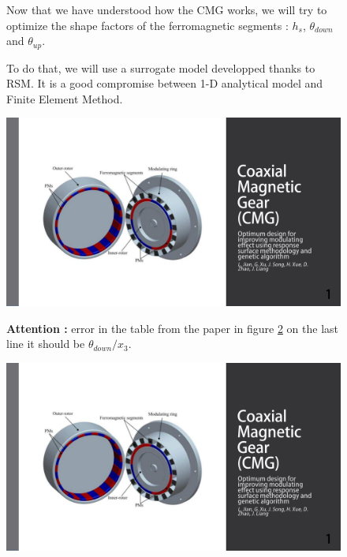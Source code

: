 \begin{figure}[H]
    \begin{minipage}{.45\linewidth}
    Now that we have understood how the CMG works, we will try to optimize the shape factors of the ferromagnetic segments : $h_s$, $\theta_{down}$ and $\theta_{up}$.
    
    To do that, we will use a surrogate model developped thanks to RSM. It is a good compromise between 1-D analytical model and Finite Element Method.
    \end{minipage}
    \hfill%
    \begin{minipage}[c]{.53\linewidth}
        \centering
        \includegraphics[page={56},width=\textwidth]{LELEC2311.allow.pdf}
        \label{fig:56_th slide}
        \caption{}
    \end{minipage}
\end{figure}

\begin{figure}[H]
    \begin{minipage}{.45\linewidth}
    \textbf{Attention :} error in the table from the paper in figure \ref{fig:57_th slide}
    on the last line it should be $\theta_{down}/x_3$.
    \end{minipage}
    \hfill%
    \begin{minipage}[c]{.53\linewidth}
        \centering
        \includegraphics[page={57},width=\textwidth]{LELEC2311.allow.pdf}
        \caption{}
        \label{fig:57_th slide}
    \end{minipage}
\end{figure}

